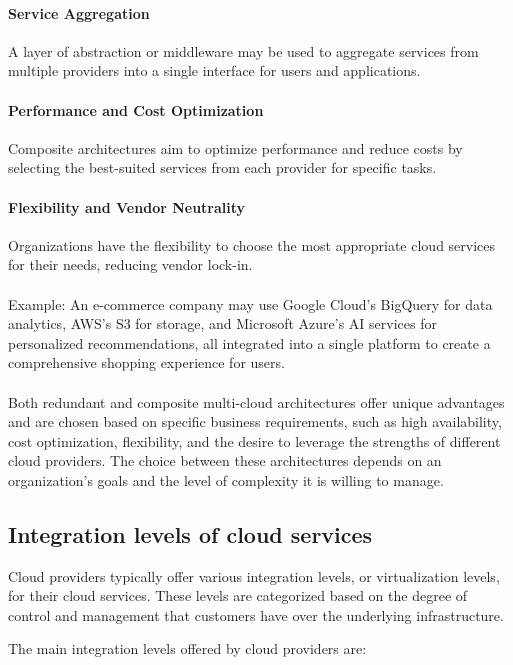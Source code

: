 \paragraph{Service Aggregation}
A layer of abstraction or middleware may be used to aggregate services 
from multiple providers into a single interface for users and applications.

\paragraph{Performance and Cost Optimization} 
Composite architectures aim to optimize performance and 
reduce costs by selecting the best-suited services from each provider for specific tasks.

\paragraph{Flexibility and Vendor Neutrality}
Organizations have the flexibility to choose the most appropriate cloud services for their needs, reducing vendor lock-in.
\\\\
Example: An e-commerce company may use Google Cloud's BigQuery for data analytics, AWS's S3 for storage, and Microsoft Azure's AI services for personalized recommendations, all integrated into a single platform to create a comprehensive shopping experience for users.
\\\\
Both redundant and composite multi-cloud architectures offer unique advantages and are chosen based on specific business requirements, such as high availability, cost optimization, flexibility, and the desire to leverage the strengths of different cloud providers. The choice between these architectures depends on an organization's goals and the level of complexity it is willing to manage.


\subsection{Integration levels of cloud services}

Cloud providers typically offer various integration levels, or virtualization levels, for their cloud services. 
These levels are categorized based on the degree of control and management that customers have over the underlying infrastructure. 

The main integration levels offered by cloud providers are:

